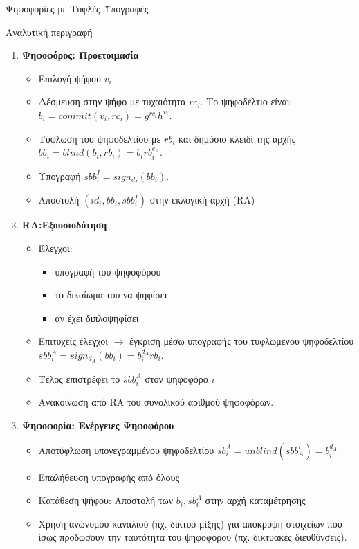 \documentclass[handout]{beamer}
\begin{document}
\begin{section}{Ψηφοφορίες με Τυφλές Υπογραφές}
\begin{frame}[allowframebreaks]{Αναλυτική περιγραφή}

\begin{enumerate}
\item \textbf{Ψηφοφόρος: Προετοιμασία}
\begin{itemize}
\item Επιλογή ψήφου $v_i$
\item Δέσμευση στην ψήφο με τυχαιότητα $rc_i$. Το ψηφοδέλτιο είναι: $b_i = commit(v_i, rc_i) = g^{rc_i} h^{v_i}$. 
\item Τύφλωση του ψηφοδελτίου με $rb_i$ και δημόσιο κλειδί της αρχής  $bb_i = blind(b_i,rb_i) = b_i rb_{i}^{e_A}$.
\item Υπογραφή $sbb^I_i = sign_{d_I}(bb_i)$.
\item Αποστολή $(id_i,bb_i,sbb^I_i)$ στην εκλογική αρχή (RA)
\end{itemize}

\framebreak

\item \textbf{RA:Εξουσιοδότηση}
\begin{itemize}
\item Έλεγχοι: 
\begin{itemize}
    \item υπογραφή του ψηφοφόρου
    \item το δικαίωμα του να ψηφίσει 
    \item αν έχει διπλοψηφίσει
\end{itemize}  
\item Επιτυχείς έλεγχοι $\rightarrow$ έγκριση μέσω υπογραφής του τυφλωμένου ψηφοδελτίου $sbb_i^A = sign_{d_A}(bb_i) = b_i^{d_A} rb_{i}$.
\item Τέλος επιστρέφει το $sbb_i^A$ στον ψηφοφόρο $i$
\item Ανακοίνωση από RA του συνολικού αριθμού ψηφοφόρων.
\end{itemize}

\framebreak

\item \textbf{Ψηφοφορία: Ενέργειες Ψηφοφόρου}
\begin{itemize}
\item Αποτύφλωση υπογεγραμμένου ψηφοδελτίου $sb_i^A = unblind(sbb^i_A)=b_i^{d_A}$
\item Επαλήθευση υπογραφής από όλους
\item Κατάθεση ψήφου: Αποστολή των $b_i,sb_i^A$ στην αρχή καταμέτρησης
\item Χρήση ανώνυμου καναλιού (πχ. δίκτυο μίξης) για απόκρυψη στοιχείων που ίσως προδώσουν την ταυτότητα του ψηφοφόρου (πχ. δικτυακές διευθύνσεις).
\end{itemize}


\end{enumerate}
\end{frame}
\end{section}
\end{document}
